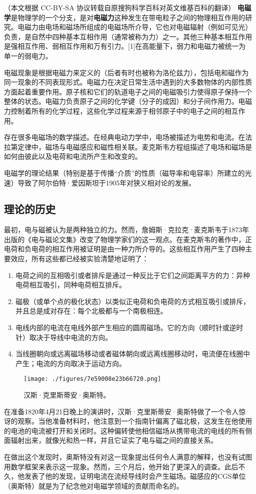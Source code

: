 
（本文根据 CC-BY-SA 协议转载自原搜狗科学百科对英文维基百科的翻译）
\textbf{电磁学}是物理学的一个分支，是对\textbf{电磁力}这种发生在带电粒子之间的物理相互作用的研究。电磁力由电场和磁场所组成的电磁场所介导，它也对电磁辐射（例如可见光）负责，是自然中四种基本互相作用（通常被称为力）之一。其他三种基本相互作用是强相互作用、弱相互作用和万有引力。[1]在高能量下，弱力和电磁力被统一为单一的弱电力。

电磁现象是根据电磁力来定义的（后者有时也被称为洛伦兹力），包括电和磁作为同一现象的不同表现形式。电磁力在决定日常生活中遇到的大多数物体的内部性质方面起着重要作用。原子核和它们的轨道电子之间的电磁吸引力使得原子保持一个整体的状态。电磁力负责原子之间的化学键（分子的成因）和分子间作用力。电磁力控制着所有的化学过程，这些化学过程来源于相邻原子中的电子之间的相互作用。

存在很多电磁场的数学描述。在经典电动力学中，电场被描述为电势和电流。在法拉第定律中，磁场与电磁感应和磁性相关联。麦克斯韦方程组描述了电场和磁场是如何由彼此以及电荷和电流所产生和改变的。

电磁学的理论结果（特别是基于传播“介质”的性质（磁导率和电容率）所建立的光速）导致了阿尔伯特·爱因斯坦于1905年对狭义相对论的发展。

\subsection{理论的历史}
最初，电与磁被认为是两种独立的力。然而，詹姆斯·克拉克·麦克斯韦于1873年出版的《电与磁论文集》改变了物理学家们的这一观点。在麦克斯韦的著作中，正电荷和负电荷的相互作用被证明是由一种力所介导的。这些相互作用产生了四种主要效应，所有这些都已经被实验清楚地证明了：
\begin{enumerate}
\item 电荷之间的互相吸引或者排斥是通过一种反比于它们之间距离平方的力：异种电荷相互吸引，同种电荷相互排斥。
\item 磁极（或单个点的极化状态）以类似正电荷和负电荷的方式相互吸引或排斥，并且总是成对存在：每个北极都与一个南极相连。
\item 电线内部的电流在电线外部产生相应的圆周磁场。它的方向（顺时针或逆时针）取决于导线中电流的方向。
\item 当线圈朝向或远离磁场移动或者磁体朝向或远离线圈移动时，电流便在线圈中产生；电流的方向取决于运动方向。
\end{enumerate}
\begin{figure}[ht]
\centering
\texttt{[image: ./figures/7e59008e23b66720.png]}
\caption{汉斯·克里斯蒂安·奥斯特。} \label{fig_DCXHZY_1}
\end{figure}
在准备1820年4月21日晚上的演讲时，汉斯·克里斯蒂安·奥斯特做了一个令人惊讶的观察。当他准备材料时，他注意到一个指南针偏离了磁北极，这发生在他使用的电池的电流被打开和关闭时。这种偏转使他相信磁场从携带电流的电线的所有侧面辐射出来，就像光和热一样，并且它证实了电与磁之间的直接关系。

在做出这个发现时，奥斯特没有对这一现象提出任何令人满意的解释，也没有试图用数学框架来表示这一现象。然而，三个月后，他开始了更深入的调查。此后不久，他发表了他的发现，证明电流在流经导线时会产生磁场。磁感应的CGS单位（奥斯特）就是为了纪念他对电磁学领域的贡献而命名的。